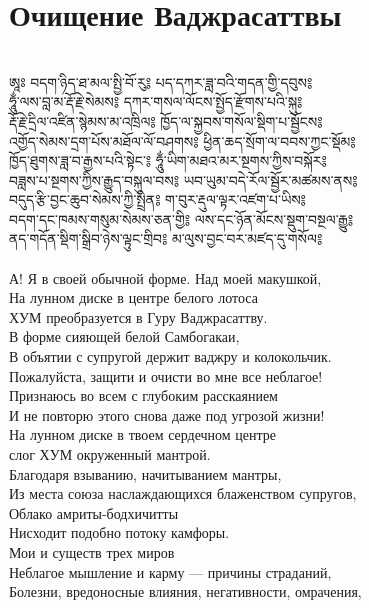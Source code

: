\section{Очищение Ваджрасаттвы}
\\
\ti
ཨཱཿ བདག་ཉིད་ཐ་མལ་སྤྱི་བོ་རུ༔ པད་དཀར་ཟླ་བའི་གདན་གྱི་དབུས༔ \\
ཧཱུྂ་ལས་བླ་མ་རྡོ་རྗེ་སེམས༔ དཀར་གསལ་ལོངས་སྤྱོད་རྫོགས་པའི་སྐུ༔\\
རྡོ་རྗེ་དྲིལ་འཛིན་སྙེམས་མ་འཁྲིལ༔ ཁྱོད་ལ་སྐྱབས་གསོལ་སྡིག་པ་སྦྱོངས༔ \\
འགྱོད་སེམས་དྲག་པོས་མཐོལ་ལོ་བཤགས༔ ཕྱིན་ཆད་སྲོག་ལ་བབས་ཀྱང་སྡོམ༔ \\
ཁྱོད་ཐུགས་ཟླ་བ་རྒྱས་པའི་སྟེང་༔ ཧཱུྂ་ཡིག་མཐའ་མར་སྔགས་ཀྱིས་བསྐོར༔ \\
བཟླས་པ་སྔགས་ཀྱིས་རྒྱུད་བསྐུལ་བས༔ ཡབ་ཡུམ་བདེ་རོལ་སྦྱོར་མཚམས་ནས༔ \\
བདུད་རྩི་བྱང་ཆུབ་སེམས་ཀྱི་སྤྲིན༔ ག་བུར་རྡུལ་ལྟར་འཛག་པ་ཡིས༔ \\
བདག་དང་ཁམས་གསུམ་སེམས་ཅན་གྱི༔ ལས་དང་ཉོན་མོངས་སྡུག་བསྔལ་རྒྱུ༔ \\
ནད་གདོན་སྡིག་སྒྲིབ་ཉེས་ལྟུང་གྲིབ༔ མ་ལུས་བྱང་བར་མཛད་དུ་གསོལ༔\\
\\
\ru
А! Я в своей обычной форме. Над моей макушкой,\\
На лунном диске в центре белого лотоса\\
ХУМ преобразуется в Гуру Ваджрасаттву.\\
В форме сияющей белой Самбогакаи,\\
В объятии с супругой держит ваджру и колокольчик.\\
Пожалуйста, защити и очисти во мне все неблагое!\\
Признаюсь во всем с глубоким расскаянием\\
И не повторю этого снова даже под угрозой жизни!\\
На лунном диске в твоем сердечном центре\\
слог ХУМ окруженный мантрой.\\
Благодаря взыванию, начитыванием мантры,\\
Из места союза наслаждающихся блаженством супругов,\\
Облако амриты-бодхичитты\\
Нисходит подобно потоку камфоры.\\
Мои и существ трех миров\\
Неблагое мышление и карму — причины страданий,\\
Болезни, вредоносные влияния, негативности, омрачения,\\
